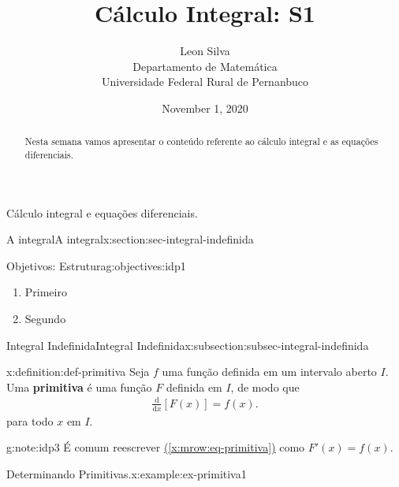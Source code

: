 \documentclass[oneside,10pt,]{article}
\title{Cálculo Integral: S1}
\author{Leon Silva\\
Departamento de Matemática\\
Universidade Federal Rural de Pernanbuco
}
\date{November 1, 2020}
\newcommand{\xreffont}{\relax}
\newcommand{\terminology}[1]{\textbf{#1}}
\numberwithin{equation}{section}
\newcommand{\dd}{\mathrm{d}}
\begin{document}
\hypertarget{x:article:integral}{}
\maketitle
\thispagestyle{empty}
\begin{abstract}
Nesta semana vamos apresentar o conteúdo referente ao cálculo integral e as equações diferenciais.%
\end{abstract}
\begin{introduction}{}%
Cálculo integral e equações diferenciais.%
\end{introduction}%
%
%
\typeout{************************************************}
\typeout{************************************************}
%
\begin{sectionptx}{A integral}{}{A integral}{}{}{x:section:sec-integral-indefinida}
\begin{objectives}{Objetivos: Estrutura}{g:objectives:idp1}
%
\begin{enumerate}
\item{}Primeiro%
\item{}Segundo%
\end{enumerate}
\end{objectives}
%
%
\typeout{************************************************}
\typeout{************************************************}
%
\begin{subsectionptx}{Integral Indefinida}{}{Integral Indefinida}{}{}{x:subsection:subsec-integral-indefinida}
\begin{definition}{}{x:definition:def-primitiva}%
Seja \(f\) uma função definida em um intervalo aberto\footnotemark{} \(I\). Uma \terminology{primitiva} é uma função \(F\) definida em \(I\), de modo que%
\begin{gather}
\frac{\dd}{\dd x}\left[F(x)\right]=f(x). \label{x:mrow:eq-primitiva}
\end{gather}
para todo \(x\) em \(I\).%
\end{definition}
%
\begin{note}{}{g:note:idp3}%
É comum reescrever \hyperref[x:mrow:eq-primitiva]{({\xreffont\ref{x:mrow:eq-primitiva}})} como \(F'(x)=f(x)\).%
\end{note}
\begin{example}{Determinando Primitivas.}{x:example:ex-primitiva1}%

\end{example}
\end{subsectionptx}
\end{sectionptx}
\end{document}
